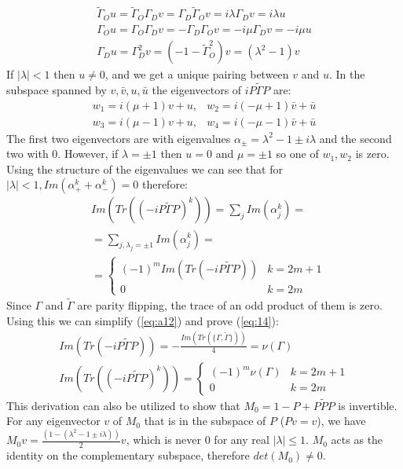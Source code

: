 \documentclass[%
 reprint,
 amsmath,amssymb,
 aps,
]{revtex4-2}
\begin{document}
\begin{align}
    \tilde\Gamma_Ou=\tilde\Gamma_O\Gamma_Dv=\Gamma_D\tilde\Gamma_Ov=i\lambda\Gamma_Dv=i\lambda u \\
    \Gamma_Ou=\Gamma_O\Gamma_Dv=-\Gamma_D\Gamma_Ov=-i\mu\Gamma_Dv=-i\mu u \\
    \Gamma_Du=\Gamma_D^2v=(-1-\tilde\Gamma_O^2)v=(\lambda^2 - 1)v
\end{align}
If $|\lambda|<1$ then $u\ne0$, and we get a unique pairing between $v$ and $u$. In the subspace spanned by $v,\bar v,u,\bar u$ the eigenvectors of $iP\tilde\Gamma P$ are:
\begin{align}
    w_1=i(\mu+1)v + u, & w_2=i(-\mu+1)\bar v + \bar u \\
    w_3=i(\mu-1)v + u, & w_4=i(-\mu-1)\bar v + \bar u
\end{align}
The first two eigenvectors are with eigenvalues $\alpha_\pm=\lambda^2-1 \pm i\lambda$ and the second two with $0$. However, if $\lambda=\pm1$ then $u=0$ and $\mu=\pm1$ so one of $w_1, w_2$ is zero.\\
Using the structure of the eigenvalues we can see that for $|\lambda|<1, Im(\alpha_+^k+\alpha_-^k)=0$ therefore:
\begin{equation}
\label{eq:a12}
    \begin{split}
        &Im\left(Tr\left((-iP\tilde\Gamma P)^k\right)\right)=\sum_{j}Im\left(\alpha_j^k\right)= \\
        &=\sum_{j,\lambda_j=\pm1}Im\left(\alpha_j^k\right)= \\
        &=\left\{\begin{matrix} (-1)^mIm\left(Tr(-iP\tilde\Gamma P)\right) & k=2m+1 \\ 0 & k=2m\end{matrix}\right.
    \end{split}
\end{equation}
Since $\Gamma$ and $\tilde\Gamma$ are parity flipping, the trace of an odd product of them is zero. Using this we can simplify (\ref{eq:a12}) and prove (\ref{eq:14}):
\begin{equation}
    \begin{split}
        Im(Tr(-iP\tilde\Gamma P)) = -\frac{Im(Tr(\{\Gamma,\tilde\Gamma\}))}{4} = \nu(\Gamma) \\
        Im(Tr((-iP\tilde\Gamma P)^k)) = \left\{\begin{matrix} (-1)^m\nu(\Gamma) & k=2m+1 \\ 0 & k=2m\end{matrix}\right.
    \end{split}
\end{equation}
This derivation can also be utilized to show that $M_0=1-P+P\tilde PP$ is invertible. For any eigenvector $v$ of $M_0$ that is in the subspace of $P$ ($Pv=v$), we have $M_0v=\frac{(1-(\lambda^2-1\pm i\lambda))}{2}v$, which is never 0 for any real $|\lambda|\le1$. $M_0$ acts as the identity on the complementary subspace, therefore $det(M_0)\ne0$.

\nocite{*}

\end{document}
